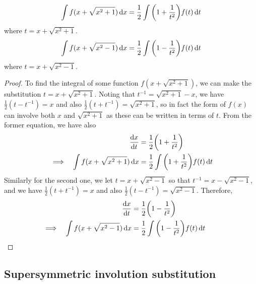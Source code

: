 \begin{theorem}
\begin{equation*}
\int f(x + \sqrt{x^2 + 1}) \dd{x}
    = \frac 12 \int \pqty{1 + \frac 1{t^2}}f(t) \dd{t}
\end{equation*}
where \(t = x + \sqrt{x^2 + 1}\).
\begin{equation*}
\int f(x + \sqrt{x^2 - 1}) \dd{x}
    = \frac 12 \int \pqty{1 - \frac 1{t^2}}f(t) \dd{t}
\end{equation*}
where \(t = x + \sqrt{x^2 - 1}\).
\end{theorem}
\begin{proof}
To find the integral of some function \(f(x + \sqrt{x^2 + 1})\), we can make
the substitution \(t = x + \sqrt{x^2 + 1}\). Noting that
\(t^{-1} = \sqrt{x^2 + 1} - x\), we have \(\frac 12(t - t^{-1}) = x\)
and also \(\frac 12(t + t^{-1}) = \sqrt{x^2 + 1}\), so in fact the form of
\(f(x)\) can involve both \(x\) and \(\sqrt{x^2 + 1}\) as these can be
written in terms of \(t\). From the former equation, we have also
\begin{alignat*}{2}
&& \dv{x}{t} &= \frac 12\pqty{1 + \frac 1{t^2}} \\
&\implies& \int f(x + \sqrt{x^2 + 1}) \dd{x}
    &= \frac 12 \int \pqty{1 + \frac 1{t^2}}f(t) \dd{t}
\end{alignat*}
Similarly for the second one, we let \(t = x + \sqrt{x^2 - 1}\) so that
\(t^{-1} = x - \sqrt{x^2 - 1}\), and we have \(\frac 12(t + t^{-1}) = x\)
and also \(\frac 12(t - t^{-1}) = \sqrt{x^2 - 1}\). Therefore,
\begin{alignat*}{2}
&& \dv{x}{t} &= \frac 12\pqty{1 - \frac 1{t^2}} \\
&\implies& \int f(x + \sqrt{x^2 - 1}) \dd{x}
    &= \frac 12 \int \pqty{1 - \frac 1{t^2}}f(t) \dd{t} \tag*{\qedhere}
\end{alignat*}
\end{proof}

\subsection{Supersymmetric involution substitution}


